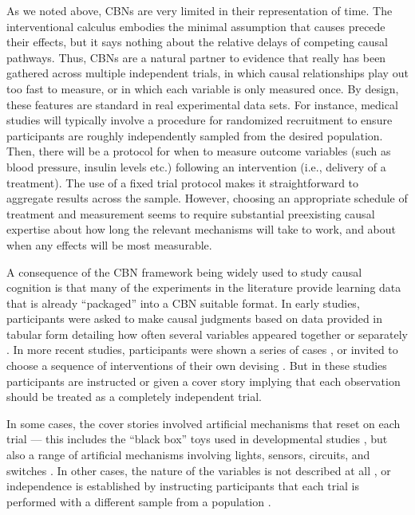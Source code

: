 \documentclass{cambridge7A}%
\begin{document}
As we noted above, CBNs are very limited in their representation of time.  The interventional calculus embodies the minimal assumption that causes precede their effects, but it says nothing about the relative delays of competing causal pathways.  
Thus, CBNs are a natural partner to evidence that really has been gathered across multiple independent trials, in which causal relationships play out too fast to measure, or in which each variable is only measured once.  By design, these features are standard in real experimental data sets.  For instance, medical studies will typically involve a procedure for randomized recruitment to ensure participants are roughly independently sampled from the desired population. Then, there will be a protocol for when to measure outcome variables (such as blood pressure, insulin levels etc.) following an intervention (i.e., delivery of a treatment).  The use of a fixed trial protocol makes it straightforward to aggregate results across the sample.  However, choosing an appropriate schedule of treatment and measurement seems to require substantial preexisting causal expertise about how long the relevant mechanisms will take to work, and about when any effects will be most measurable.  

A consequence of the CBN framework being widely used to study causal cognition is that many of the experiments in the literature provide learning data that is already ``packaged'' into a CBN suitable format.  In early studies, participants were asked to make causal judgments based on data provided in tabular form detailing how often several variables appeared together or separately \citep{cheng1990probabilistic}.   In more recent studies, participants were shown a series of cases \citep{gopnik2000detecting,sobel2004children,deverett2012learning,lagnado2002learning},  or invited to choose a sequence of interventions of their own devising \citep{coenen2015strategies,bramley2015fcs,bramley2017neurath}.  But in these studies participants are instructed or given a cover story implying that each observation should be treated as a completely independent trial.   

In some cases, the cover stories involved artificial mechanisms that reset on each trial --- this includes the ``black box'' toys used in developmental studies \citep{mccormack2016children,gopnik2007causal,coenen2017beliefs}, but also a range of artificial mechanisms involving lights, sensors, circuits, and switches \citep{waldmann2000competition,sobel2006importance,coenen2017beliefs}.  In other cases, the nature of the variables is not described at all \citep{bramley2015fcs,bramley2017neurath,rehder2005feature}, or independence is established by instructing participants that each trial is performed with a different sample from a population \citep{rehder2003causal, rottman2012causal, rehder2017failures}.
\end{document}
